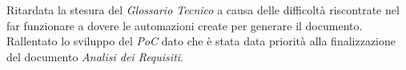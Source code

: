 \newline Ritardata la stesura del \emph{Glossario Tecnico} a causa delle difficoltà riscontrate nel far funzionare a dovere le automazioni create per generare il documento.
\newline Rallentato lo sviluppo del \emph{PoC} dato che è stata data priorità alla finalizzazione del documento \emph{Analisi dei Requisiti}.
